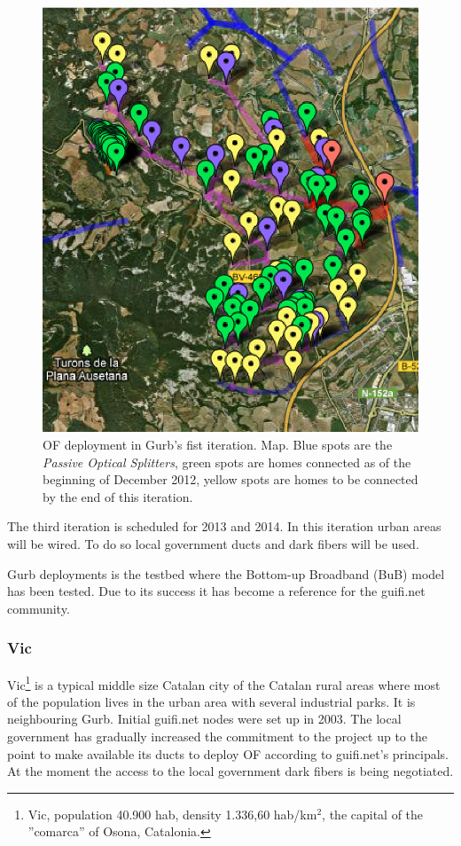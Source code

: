 \begin{figure}[htbp]
  \centering
  \includegraphics[scale=1.3]{sect2/figures/Gurb_it2_map.eps} 
  \caption{OF deployment in Gurb's fist iteration. Map. Blue spots are the \emph{Passive Optical Splitters}, green spots are homes connected as of the beginning of December 2012, yellow spots are homes to be connected by the end of this iteration.}
  \label{fig:gurb_it2_map}
\end{figure}

The third iteration is scheduled for 2013 and 2014. In this iteration urban areas will be wired. To do so local government ducts and dark fibers will be used.

Gurb deployments is the testbed where the Bottom-up Broadband (BuB) model has been tested. Due to its success it has become a reference for the guifi.net community.

\FloatBarrier
\subsubsection{Vic}

Vic\footnote{Vic, population 40.900 hab, density 1.336,60 hab/km$^{2}$, the capital of the ''comarca'' of Osona, Catalonia.} is a typical middle size Catalan city of the Catalan rural areas where most of the population lives in the urban area with several industrial parks. It is neighbouring Gurb. Initial guifi.net nodes were set up in 2003. The local government has gradually increased the commitment to the project up to the point to make available its ducts to deploy OF according to guifi.net's principals. At the moment the access to the local government dark fibers is being negotiated.

